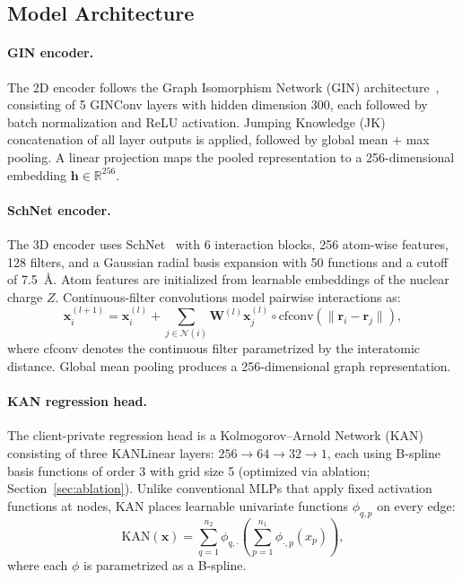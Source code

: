 \documentclass[twocolumn]{article}
\begin{document}
\subsection{Model Architecture}\label{sec:architecture}

\paragraph{GIN encoder.}
The 2D encoder follows the Graph Isomorphism Network (GIN) architecture~\cite{Xu2019_GIN}, consisting of 5 GINConv layers with hidden dimension 300, each followed by batch normalization and ReLU activation.
Jumping Knowledge (JK) concatenation of all layer outputs is applied, followed by global mean + max pooling.
A linear projection maps the pooled representation to a 256-dimensional embedding $\mathbf{h} \in \mathbb{R}^{256}$.

\paragraph{SchNet encoder.}
The 3D encoder uses SchNet~\cite{Schutt2018_SchNet} with 6 interaction blocks, 256 atom-wise features, 128 filters, and a Gaussian radial basis expansion with 50 functions and a cutoff of 7.5~\AA{}.
Atom features are initialized from learnable embeddings of the nuclear charge $Z$.
Continuous-filter convolutions model pairwise interactions as:
\begin{equation}
  \mathbf{x}_i^{(l+1)} = \mathbf{x}_i^{(l)} + \sum_{j \in \mathcal{N}(i)} \mathbf{W}^{(l)} \mathbf{x}_j^{(l)} \circ \text{cfconv}(\|\mathbf{r}_i - \mathbf{r}_j\|),
\end{equation}
where cfconv denotes the continuous filter parametrized by the interatomic distance.
Global mean pooling produces a 256-dimensional graph representation.

\paragraph{KAN regression head.}\label{sec:kan_head}
The client-private regression head is a Kolmogorov--Arnold Network (KAN)~\cite{KAN2024} consisting of three KANLinear layers: $256 \to 64 \to 32 \to 1$, each using B-spline basis functions of order 3 with grid size 5 (optimized via ablation; Section~\ref{sec:ablation}).
Unlike conventional MLPs that apply fixed activation functions at nodes, KAN places learnable univariate functions $\phi_{q,p}$ on every edge:
\begin{equation}
  \text{KAN}(\mathbf{x}) = \sum_{q=1}^{n_2} \phi_{q,\cdot}\!\left(\sum_{p=1}^{n_1} \phi_{\cdot,p}(x_p)\right),
\end{equation}
where each $\phi$ is parametrized as a B-spline.
\end{document}
